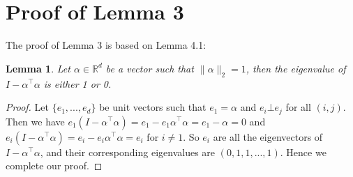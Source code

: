 \documentclass{article}
\newtheorem{lemma}{Lemma}
\begin{document}
\section{Proof of Lemma 3}
The proof of Lemma 3 is based on Lemma 4.1: 
\begin{lemma}
Let $\alpha \in \mathbb{R}^d$ be a vector such that $\|\alpha\|_2=1$, then the eigenvalue of $I-\alpha^{\top}\alpha$ is either 1 or 0.
\end{lemma}
\begin{proof}
Let $\{e_1,...,e_d\}$ be unit vectors such that $e_1=\alpha$ and $e_i\bot e_j$ for all $(i,j)$. Then we have $e_1(I-\alpha^{\top}\alpha)=e_1-e_1\alpha^{\top}\alpha=e_1-\alpha=0$ and $e_i(I-\alpha^{\top}\alpha)=e_i-e_i\alpha^{\top}\alpha=e_i$ for $i\neq 1$. So $e_i$ are all the eigenvectors of $I-\alpha^{\top}\alpha$, and their corresponding eigenvalues are $(0,1,1,...,1)$. Hence we complete our proof.
\end{proof}
\end{document}
